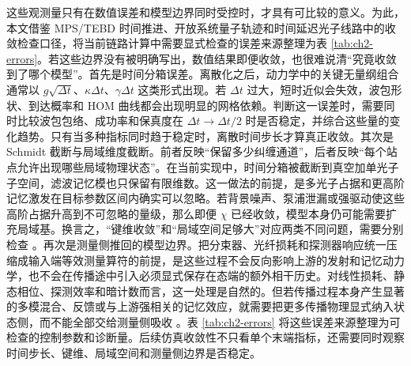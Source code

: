 这些观测量只有在数值误差和模型边界同时受控时，才具有可比较的意义。为此，本文借鉴 MPS/TEBD 时间推进\cite{Vidal2004TEBD,Schollwoeck2011MPS,Paeckel2019TimeEvolutionMPS}、开放系统量子轨迹\cite{Daley2014QuantumTrajectories}和时间延迟光子线路\cite{Pichler2016TimeDelaysMPS,Guimond2017DelayedCoherentFeedbackMPS}中的收敛检查口径，将当前链路计算中需要显式检查的误差来源整理为表 \ref{tab:ch2-errors}。若这些边界没有被明确写出，数值结果即便收敛，也很难说清“究竟收敛到了哪个模型”。首先是时间分箱误差。离散化之后，动力学中的关键无量纲组合通常以 $g\sqrt{\Delta t}$、$\kappa\Delta t$、$\gamma\Delta t$ 这类形式出现。若 $\Delta t$ 过大，短时近似会失效，波包形状、到达概率和 HOM 曲线都会出现明显的网格依赖。判断这一误差时，需要同时比较波包包络、成功率和保真度在 $\Delta t\to \Delta t/2$ 时是否稳定，并综合这些量的变化趋势。只有当多种指标同时趋于稳定时，离散时间步长才算真正收敛。其次是 Schmidt 截断与局域维度截断。前者反映“保留多少纠缠通道”，后者反映“每个站点允许出现哪些局域物理状态”。在当前实现中，时间分箱被截断到真空加单光子子空间，滤波记忆模也只保留有限维数。这一做法的前提，是多光子占据和更高阶记忆激发在目标参数区间内确实可以忽略。若背景噪声、泵浦泄漏或强驱动使这些高阶占据升高到不可忽略的量级，那么即便 $\chi$ 已经收敛，模型本身仍可能需要扩充局域基。换言之，“键维收敛”和“局域空间足够大”对应两类不同问题，需要分别检查 \cite{Schollwoeck2011MPS,Paeckel2019TimeEvolutionMPS}。再次是测量侧推回的模型边界。把分束器、光纤损耗和探测器响应统一压缩成输入端等效测量算符的前提，是这些过程不会反向影响上游的发射和记忆动力学，也不会在传播途中引入必须显式保存在态端的额外相干历史。对线性损耗、静态相位、探测效率和暗计数而言，这一处理是自然的。但若传播过程本身产生显著的多模混合、反馈或与上游强相关的记忆效应，就需要把更多传播物理显式纳入状态侧，而不能全部交给测量侧吸收 \cite{Pichler2016TimeDelaysMPS,Guimond2017DelayedCoherentFeedbackMPS,ArranzRegidor2021WaveguideQED}。表 \ref{tab:ch2-errors} 将这些误差来源整理为可检查的控制参数和诊断量。后续仿真收敛性不只看单个末端指标，还需要同时观察时间步长、键维、局域空间和测量侧边界是否稳定。
